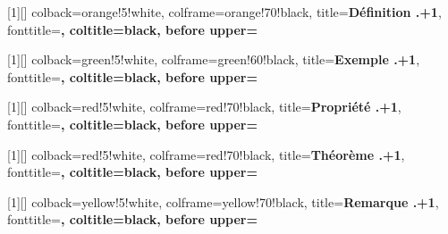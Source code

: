\usepackage[most]{tcolorbox}




[1][]{
    colback=orange!5!white,
    colframe=orange!70!black,
    title={\textbf{Définition \thechapter.\number\numexpr\thedefinition+1\relax}},
    fonttitle=\bfseries,
    coltitle=black,
    before upper={\incdefinition}
}

[1][]{
    colback=green!5!white,
    colframe=green!60!black,
    title={\textbf{Exemple \thechapter.\number\numexpr\theexemple+1\relax}},
    fonttitle=\bfseries,
    coltitle=black,
    before upper={\incexemple}
}



[1][]{
    colback=red!5!white,
    colframe=red!70!black,
    title={\textbf{Propriété \thechapter.\number\numexpr\thepropriete+1\relax}},
    fonttitle=\bfseries,
    coltitle=black,
    before upper={\incpropriete}
}

[1][]{
    colback=red!5!white,
    colframe=red!70!black,
    title={\textbf{Théorème \thechapter.\number\numexpr\thetheoreme+1\relax}},
    fonttitle=\bfseries,
    coltitle=black,
    before upper={\inctheoreme}
}


[1][]{
    colback=yellow!5!white,
    colframe=yellow!70!black,
    title={\textbf{Remarque \thechapter.\number\numexpr\theremarque+1\relax}},
    fonttitle=\bfseries,
    coltitle=black,
    before upper={\incremarque}
}

